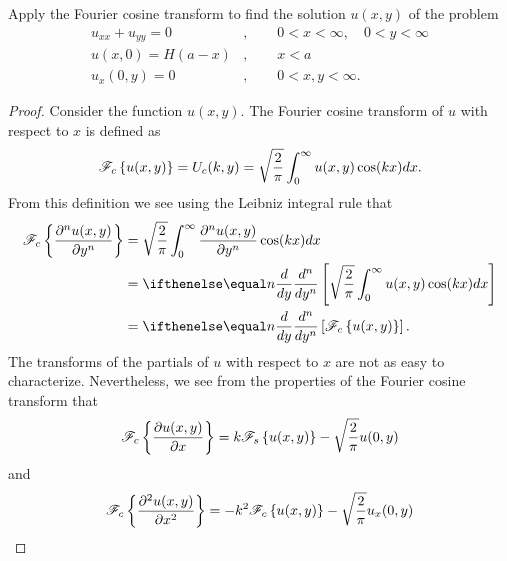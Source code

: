\begin{problem}{2.20}
  Apply the Fourier cosine transform to find the solution $u(x, y)$ of the problem
  \begin{align*}
    u_{xx} + u_{yy} = 0 &, \qquad 0 < x < \infty, \quad 0 < y < \infty \\
    u(x, 0) = H(a-x) &, \qquad x < a \\
    u_x(0, y) = 0 &, \qquad 0 < x, y < \infty.
  \end{align*}
\end{problem}

\begin{proof}
  Consider the function $u(x, y)$. The Fourier cosine transform
  of $u$ with respect to $x$ is defined as
  \begin{align*}
    \mathscr{F}_c\left\{ {u(x, y)} \right\} = U_c(k, y) = \sqrt{\frac{2}{\pi}} \int_{0}^{\infty}  u(x, y)  \cos (kx)dx.
  \end{align*}
  From this definition we see using the Leibniz integral rule that
  \begin{align*}
    \fouriercos{\frac{\partial^n u(x,y)}{\partial y^n}}
    &= \sqrt{\frac{2}{\pi}} \int_{0}^{\infty} \frac{\partial^n u(x,y)}{\partial y^n} \cos (kx)dx \\
    &= \der{y}{n}\left[\sqrt{\frac{2}{\pi}} \int_{0}^{\infty} u(x,y) \cos (kx)dx\right] \\
    &= \der{y}{n}\left[\fouriercos{u(x,y)}\right].
  \end{align*}
  The transforms of the partials of $u$ with respect to $x$ are not as easy to characterize. Nevertheless,
  we see from the properties of the Fourier cosine transform that
  \begin{align*}
    \mathscr{F}_c\left\{ {\frac{\partial u(x,y)}{\partial x}} \right\} = k \mathscr{F}_s\left\{ {u(x,y)} \right\} - \sqrt{\frac{2}{\pi}}u(0, y)
  \end{align*}
  and
  \begin{align*}
    \mathscr{F}_c\left\{ {\frac{\partial^2 u(x,y)}{\partial x^2}} \right\} = -k^2 \mathscr{F}_c\left\{ {u(x,y)} \right\} - \sqrt{\frac{2}{\pi}}u_x(0, y)
  \end{align*}


\end{proof}

